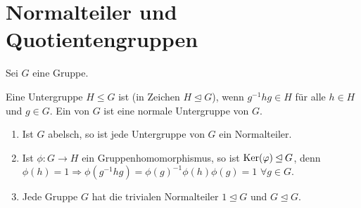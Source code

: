\section{Normalteiler und Quotientengruppen}

Sei $G$ eine Gruppe.

\begin{definition}
	Eine Untergruppe $H\le G$ ist  (in Zeichen $H\unlhd G$), wenn $g^{-1}hg\in H$ für alle $h\in H$ und $g\in G$. Ein  von $G$ ist eine normale Untergruppe von $G$.
\end{definition}

\begin{example}
	\begin{enumerate}[label=(\alph*)]
		\item Ist $G$ abelsch, so ist jede Untergruppe von $G$ ein Normalteiler.
		\item Ist $\phi: G\to H$ ein Gruppenhomomorphismus, so ist $\operatorname{Ker}(\varphi)\unlhd G$, denn $\phi(h)=1\Rightarrow\phi(g^{-1}hg)=\phi(g)^{-1}\phi(h)\phi(g)=1$ $\forall g\in G$.
		\item Jede Gruppe $G$ hat die trivialen Normalteiler $1\unlhd G$ und $G\unlhd G$.
	\end{enumerate}
\end{example}

